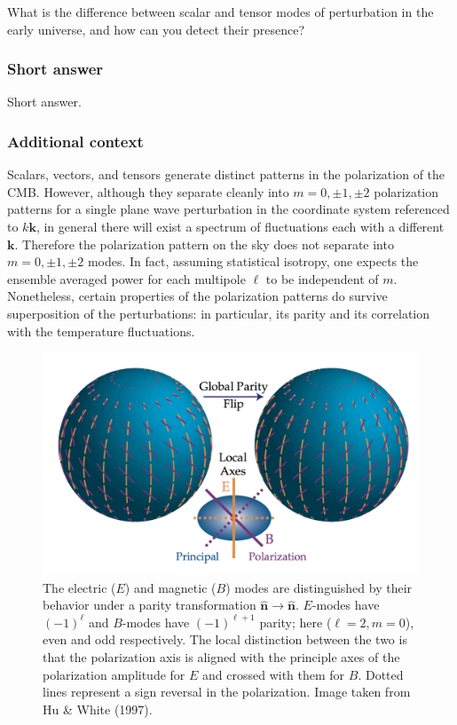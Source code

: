 \documentclass[a4paper,11pt]{article}
\begin{document}
What is the difference between scalar and tensor modes of perturbation in the early universe, and how can you detect their presence?

\subsubsection{Short answer}

Short answer.

\subsubsection{Additional context}

{\noindent}Scalars, vectors, and tensors generate distinct patterns in the polarization of the CMB. However, although they separate cleanly into $m=0,\pm1,\pm2$ polarization patterns for a single plane wave perturbation in the coordinate system referenced to $k\bm{k}$, in general there will exist a spectrum of fluctuations each with a different $\bm{k}$. Therefore the polarization pattern on the sky does not separate into $m=0,\pm1,\pm2$ modes. In fact, assuming statistical isotropy, one expects the ensemble averaged power for each multipole $\ell$ to be independent of $m$. Nonetheless, certain properties of the polarization patterns do survive superposition of the perturbations: in particular, its parity and its correlation with the temperature fluctuations.

\begin{figure}[h]
    \includegraphics[width=16cm]{figures/EBmodes.png}
    \centering
    \caption{\footnotesize{The electric ($E$) and magnetic ($B$) modes are distinguished by their behavior under a parity transformation $\bm{\hat{n}}\rightarrow\bm{\hat{n}}$. $E$-modes have $(-1)^\ell$ and $B$-modes have $(-1)^{\ell+1}$ parity; here ($\ell=2,m=0$), even and odd respectively. The local distinction between the two is that the polarization axis is aligned with the principle axes of the polarization amplitude for $E$ and crossed with them for $B$. Dotted lines represent a sign reversal in the polarization. Image taken from Hu \& White (1997).}}
    \label{fig:ebmodes}
\end{figure}
\end{document}
